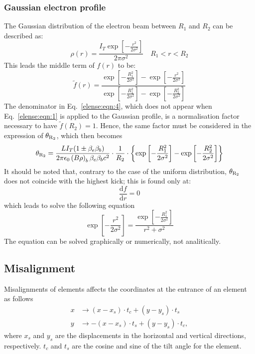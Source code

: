 \documentclass[english]{article}
\begin{document}
\subsubsection{Gaussian electron profile}
The Gaussian distribution of the electron beam between $R_1$ and $R_2$
can be described as:
\begin{equation}
\rho(r) = \frac{I_T \exp\left[-\frac{r^2}{2\sigma^2}\right]}{2\pi\sigma^2} \quad R_1 < r < R_2
\end{equation}
This leads the middle term of $f(r)$ to be:
\begin{equation}
  \tilde f(r)=\frac{\exp\left[-\frac{R_1^2}{2\sigma^2}\right]-\exp\left[-\frac{r^2}{2\sigma^2}\right]}
                   {\exp\left[-\frac{R_1^2}{2\sigma^2}\right]-\exp\left[-\frac{R_2^2}{2\sigma^2}\right]}
  \label{elense:eqn:4}
\end{equation}
The denominator in Eq.~\ref{elense:eqn:4}, which does not appear when Eq.~\ref{elense:eqn:1}
is applied to the Gaussian profile, is a normalisation factor necessary
to have $\tilde f(R_2)=1$. Hence, the same factor must be considered in the
expression of $\theta_{\rm R_2}$, which then becomes
\begin{equation}
  \theta_{\rm R_2} = \frac{LI_T(1\pm\beta_e\beta_b)}{2\pi\epsilon_0  \left(B\rho\right)_b\beta_e\beta_b c^2}\cdot\frac{1}{R_2}
  \cdot\left\{\exp\left[-\frac{R_1^2}{2\sigma^2}\right]-\exp\left[-\frac{R_2^2}{2\sigma^2}\right]\right\}
\end{equation}
It should be noted that, contrary to the case of the uniform distribution,
$\theta_{\rm R_2}$ does not coincide with the highest kick; this is found only
at:
\begin{equation}
  \frac{\textrm{d}f}{\textrm{d}r}=0
\end{equation}
which leads to solve the following equation
\begin{equation}
  \exp\left[-\frac{r^2}{2\sigma^2}\right] = \frac{\exp\left[-\frac{R_1^2}{2\sigma^2}\right]}{r^2+\sigma^2}
\end{equation}
The equation can be solved graphically or numerically, not analitically.

\subsection{Misalignment}

Misalignments of elements affects the coordinates at the entrance of an
element as follows
\begin{align}
    x &\to (x-x_s)\cdot t_c + (y-y_s)\cdot t_s \\
    y &\to -(x-x_s)\cdot t_s + (y-y_s)\cdot t_c,
\end{align}
where $x_s$ and $y_s$ are the displacements in the horizontal and vertical
directions, respectively. $t_c$ and $t_s$ are the cosine and sine of the tilt
angle for the element.
\end{document}
